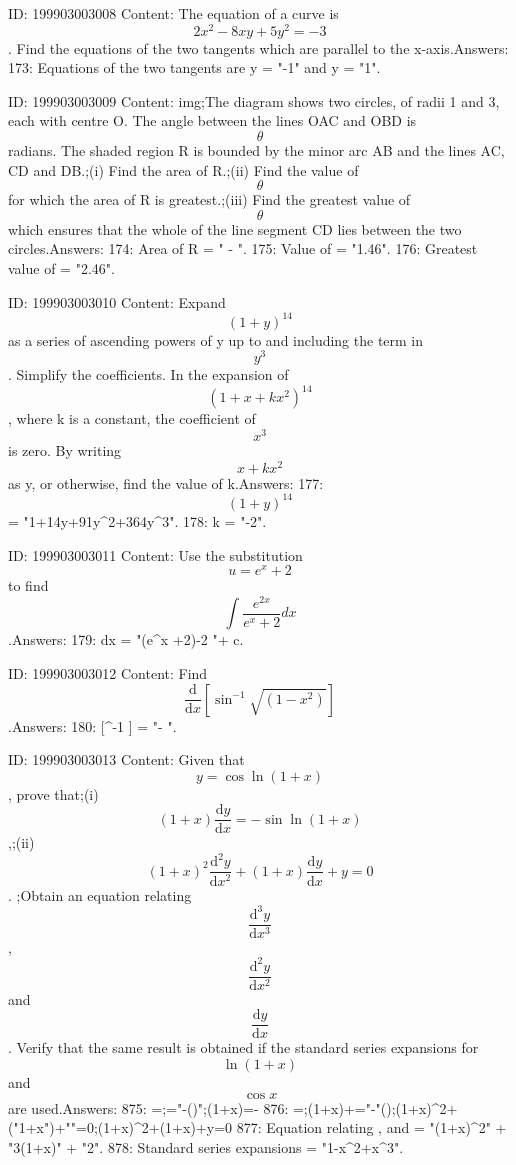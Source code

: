 \documentclass{article}
\begin{document}
ID: 199903003008
Content:
The equation of a curve is \[2x^2 - 8xy + 5y^2 = -3\]. Find the equations of the two tangents which are parallel to the x-axis.Answers:
173: Equations of the two tangents are y = "-1" and y = "1".

ID: 199903003009
Content:
img;The diagram shows two circles, of radii 1 and 3, each with centre O. The angle between the lines OAC and OBD is \[\theta\] radians. The shaded region R is bounded by the minor arc AB and the lines AC, CD and DB.;(i) Find the area of R.;(ii) Find the value of \[\theta\] for which the area of R is greatest.;(iii) Find the greatest value of \[\theta\] which ensures that the whole of the line segment CD lies between the two circles.Answers:
174: Area of R = " \sin{\theta} - \theta".
175: Value of \theta = "1.46".
176: Greatest value of \theta = "2.46".

ID: 199903003010
Content:
Expand \[(1 + y)^{14}\] as a series of ascending powers of y up to and including the term in \[y^3\]. Simplify the coefficients. In the expansion of \[(1 + x + kx^2)^{14}\], where k is a constant, the coefficient of \[x^3\] is zero. By writing \[x + kx^2\] as y, or otherwise, find the value of k.Answers:
177: \[(1 + y)^{14}\] = "1+14y+91y^2+364y^3".
178: k = "-2".

ID: 199903003011
Content:
Use the substitution \[u = e^x + 2\] to find \[\int \frac {e^{2x}}{e^x + 2} dx\].Answers:
179: \int {} dx = "(e^x +2)-2 "+ c.

ID: 199903003012
Content:
Find \[\frac{\mathrm{d} }{\mathrm{d} x}[\sin ^{-1} \sqrt{(1 - x^2)}]\].Answers:
180:  [\sin^{-1} ] = "- ".

ID: 199903003013
Content:
Given that \[y = \cos {\ln(1 + x)}\], prove that;(i) \[(1 + x)\frac{\mathrm{d} y}{\mathrm{d} x} = - \sin {\ln(1 + x)}\],;(ii) \[(1 + x)^2 \frac{\mathrm{d}^2 y}{\mathrm{d} x^2} + (1 + x)\frac{\mathrm{d} y}{\mathrm{d} x} + y = 0\]. ;Obtain an equation relating \[\frac{\mathrm{d}^3 y}{\mathrm{d} x^3}\], \[\frac{\mathrm{d}^2 y}{\mathrm{d} x^2}\] and \[\frac{\mathrm{d} y}{\mathrm{d} x}\]. Verify that the same result is obtained if the standard series expansions for \[\ln (1 + x)\] and \[\cos x\] are used.Answers:
875: =;="-\left(\right)";\therefore \left(1+x\right)=-
876: =;\left(1+x\right)+="-"\left(\right);{{\left(1+x\right)}^{2}}+("1+x")+""=0;{{\left(1+x\right)}^{2}}+\left(1+x\right)+y=0
877: Equation relating ,  and  = "(1+x)^2" + "3(1+x)" + "2".
878: Standard series expansions = "1-x^2+x^3".
\end{document}
